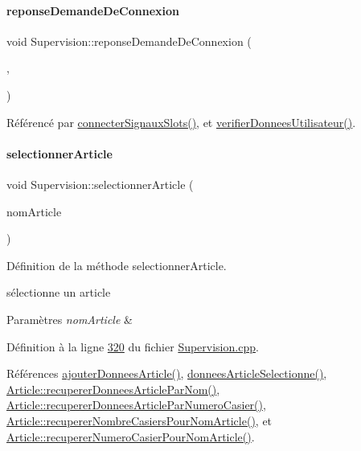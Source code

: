 \paragraph{\texorpdfstring{reponse\+Demande\+De\+Connexion}{reponseDemandeDeConnexion}}
{\footnotesize\ttfamily void Supervision\+::reponse\+Demande\+De\+Connexion (\begin{DoxyParamCaption}\item[{bool}]{,  }\item[{Q\+String}]{ }\end{DoxyParamCaption})\hspace{0.3cm}{\ttfamily [signal]}}



Référencé par \hyperlink{_supervision_8cpp_source_l00273}{connecter\+Signaux\+Slots()}, et \hyperlink{_supervision_8cpp_source_l00224}{verifier\+Donnees\+Utilisateur()}.

\mbox{\label{class_supervision_a2efb7e4dabe2664c9cfd41d703b6250c}} 
\paragraph{\texorpdfstring{selectionner\+Article}{selectionnerArticle}}
{\footnotesize\ttfamily void Supervision\+::selectionner\+Article (\begin{DoxyParamCaption}\item[{Q\+String}]{nom\+Article }\end{DoxyParamCaption})\hspace{0.3cm}{\ttfamily [slot]}}



Définition de la méthode selectionner\+Article. 

sélectionne un article 
\begin{DoxyParams}{Paramètres}
{\em nom\+Article} & \\
\hline
\end{DoxyParams}


Définition à la ligne \hyperlink{_supervision_8cpp_source_l00320}{320} du fichier \hyperlink{_supervision_8cpp_source}{Supervision.\+cpp}.



Références \hyperlink{_supervision_8cpp_source_l00508}{ajouter\+Donnees\+Article()}, \hyperlink{class_supervision_ae486eafc331964e223c35ae2b54fa669}{donnees\+Article\+Selectionne()}, \hyperlink{_article_8cpp_source_l00103}{Article\+::recuperer\+Donnees\+Article\+Par\+Nom()}, \hyperlink{_article_8cpp_source_l00156}{Article\+::recuperer\+Donnees\+Article\+Par\+Numero\+Casier()}, \hyperlink{_article_8cpp_source_l00218}{Article\+::recuperer\+Nombre\+Casiers\+Pour\+Nom\+Article()}, et \hyperlink{_article_8cpp_source_l00250}{Article\+::recuperer\+Numero\+Casier\+Pour\+Nom\+Article()}.



